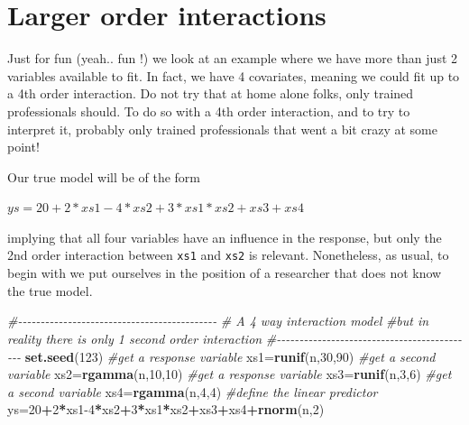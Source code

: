 \documentclass[
]{book}
\newenvironment{Shaded}{\begin{snugshade}}{\end{snugshade}}
\newcommand{\CommentTok}[1]{\textcolor[rgb]{0.56,0.35,0.01}{\textit{#1}}}
\newcommand{\DecValTok}[1]{\textcolor[rgb]{0.00,0.00,0.81}{#1}}
\newcommand{\FunctionTok}[1]{\textcolor[rgb]{0.13,0.29,0.53}{\textbf{#1}}}
\newcommand{\NormalTok}[1]{#1}
\newcommand{\OtherTok}[1]{\textcolor[rgb]{0.56,0.35,0.01}{#1}}
\newcommand{\SpecialCharTok}[1]{\textcolor[rgb]{0.81,0.36,0.00}{\textbf{#1}}}
\begin{document}
\hypertarget{larger-order-interactions}{%
\section{Larger order interactions}\label{larger-order-interactions}}

Just for fun (yeah.. fun !) we look at an example where we have more than just 2 variables available to fit. In fact, we have 4 covariates, meaning we could fit up to a 4th order interaction. Do not try that at home alone folks, only trained professionals should. To do so with a 4th order interaction, and to try to interpret it, probably only trained professionals that went a bit crazy at some point!

Our true model will be of the form

\(ys=20+2*xs1-4*xs2+3*xs1*xs2+xs3+xs4\)

implying that all four variables have an influence in the response, but only the 2nd order interaction between \texttt{xs1} and \texttt{xs2} is relevant. Nonetheless, as usual, to begin with we put ourselves in the position of a researcher that does not know the true model.

\begin{Shaded}
\begin{Highlighting}[]
\CommentTok{\#{-}{-}{-}{-}{-}{-}{-}{-}{-}{-}{-}{-}{-}{-}{-}{-}{-}{-}{-}{-}{-}{-}{-}{-}{-}{-}{-}{-}{-}{-}{-}{-}{-}{-}{-}{-}{-}{-}{-}{-}{-}{-}{-}{-}}
\CommentTok{\# A 4 way interaction model}
\CommentTok{\#but in reality there is only 1 second order interaction}
\CommentTok{\#{-}{-}{-}{-}{-}{-}{-}{-}{-}{-}{-}{-}{-}{-}{-}{-}{-}{-}{-}{-}{-}{-}{-}{-}{-}{-}{-}{-}{-}{-}{-}{-}{-}{-}{-}{-}{-}{-}{-}{-}{-}{-}{-}{-}}
\FunctionTok{set.seed}\NormalTok{(}\DecValTok{123}\NormalTok{)}
\CommentTok{\#get a response variable}
\NormalTok{xs1}\OtherTok{=}\FunctionTok{runif}\NormalTok{(n,}\DecValTok{30}\NormalTok{,}\DecValTok{90}\NormalTok{)}
\CommentTok{\#get a second variable}
\NormalTok{xs2}\OtherTok{=}\FunctionTok{rgamma}\NormalTok{(n,}\DecValTok{10}\NormalTok{,}\DecValTok{10}\NormalTok{)}
\CommentTok{\#get a response variable}
\NormalTok{xs3}\OtherTok{=}\FunctionTok{runif}\NormalTok{(n,}\DecValTok{3}\NormalTok{,}\DecValTok{6}\NormalTok{)}
\CommentTok{\#get a second variable}
\NormalTok{xs4}\OtherTok{=}\FunctionTok{rgamma}\NormalTok{(n,}\DecValTok{4}\NormalTok{,}\DecValTok{4}\NormalTok{)}
\CommentTok{\#define the linear predictor}
\NormalTok{ys}\OtherTok{=}\DecValTok{20}\SpecialCharTok{+}\DecValTok{2}\SpecialCharTok{*}\NormalTok{xs1}\DecValTok{{-}4}\SpecialCharTok{*}\NormalTok{xs2}\SpecialCharTok{+}\DecValTok{3}\SpecialCharTok{*}\NormalTok{xs1}\SpecialCharTok{*}\NormalTok{xs2}\SpecialCharTok{+}\NormalTok{xs3}\SpecialCharTok{+}\NormalTok{xs4}\SpecialCharTok{+}\FunctionTok{rnorm}\NormalTok{(n,}\DecValTok{2}\NormalTok{)}
\end{Highlighting}
\end{Shaded}
\end{document}
